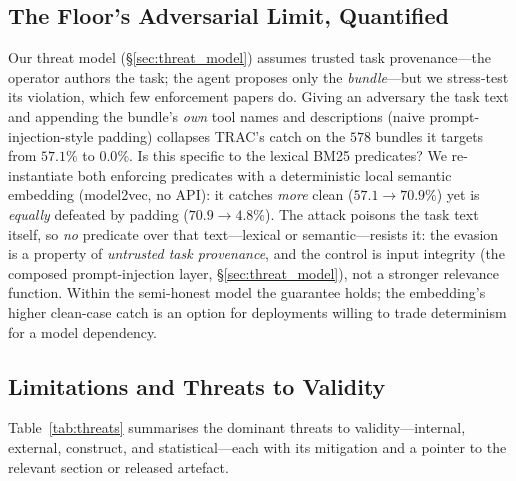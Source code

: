 \documentclass[sigconf,review,anonymous]{acmart}
\begin{document}
\subsection{The Floor's Adversarial Limit, Quantified}
\label{sec:adversarial}
Our threat model (\S\ref{sec:threat_model}) assumes trusted task provenance---the operator authors the task; the agent proposes only the \emph{bundle}---but we stress-test its violation, which few enforcement papers do. Giving an adversary the task text and appending the bundle's \emph{own} tool names and descriptions (naive prompt-injection-style padding) collapses TRAC's catch on the $578$ bundles it targets from $57.1\%$ to $0.0\%$. Is this specific to the lexical BM25 predicates? We re-instantiate both enforcing predicates with a deterministic local semantic embedding (model2vec, no API): it catches \emph{more} clean ($57.1\!\to\!70.9\%$) yet is \emph{equally} defeated by padding ($70.9\!\to\!4.8\%$). The attack poisons the task text itself, so \emph{no} predicate over that text---lexical or semantic---resists it: the evasion is a property of \emph{untrusted task provenance}, and the control is input integrity (the composed prompt-injection layer, \S\ref{sec:threat_model}), not a stronger relevance function. Within the semi-honest model the guarantee holds; the embedding's higher clean-case catch is an option for deployments willing to trade determinism for a model dependency.

\subsection{Limitations and Threats to Validity}
\label{sec:limitations}

Table~\ref{tab:threats} summarises the dominant threats to validity---internal, external, construct, and statistical---each with its mitigation and a pointer to the relevant section or released artefact.
\end{document}
